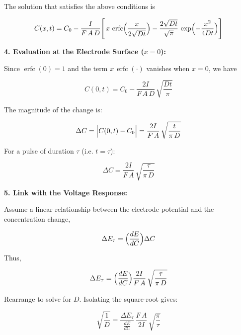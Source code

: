 \documentclass{article}
\begin{document}
The solution that satisfies the above conditions is

\begin{equation}\label{eq:con:4}
C(x,t) = C_0 - \frac{I}{F\,A\,D}\Biggl[\,x\,\operatorname{erfc}\Bigl(\frac{x}{2\sqrt{Dt}}\Bigr) - \frac{2\sqrt{Dt}}{\sqrt{\pi}}\,\exp\Bigl(-\frac{x^2}{4Dt}\Bigr)\Biggr]\,
\end{equation}

\vspace{1ex}
\textbf{4. Evaluation at the Electrode Surface (\( x=0 \)):}

Since \(\operatorname{erfc}(0)=1\) and the term \(x\,\operatorname{erfc}(\cdot)\) vanishes when \( x=0 \), we have

\begin{equation}\label{eq:con:5}
C(0,t) = C_0 - \frac{2I}{F\,A\,D}\,\sqrt{\frac{Dt}{\pi}}\,
\end{equation}

The magnitude of the change is:

\begin{equation}\label{eq:con:6}
\Delta C = \Bigl|C(0,t)-C_0\Bigr| = \frac{2I}{F\,A}\,\sqrt{\frac{t}{\pi\,D}}\,
\end{equation}

For a pulse of duration \(\tau\) (i.e. \(t=\tau\)):

\begin{equation}\label{eq:con:7}
\Delta C = \frac{2I}{F\,A}\,\sqrt{\frac{\tau}{\pi\,D}}\,
\end{equation}

\vspace{1ex}
\textbf{5. Link with the Voltage Response:}

Assume a linear relationship between the electrode potential and the concentration change,

\begin{equation}\label{eq:con:8}
\Delta E_\tau = \Bigl(\frac{dE}{dC}\Bigr)\Delta C\,
\end{equation}

Thus,

\begin{equation}\label{eq:con:9}
\Delta E_\tau = \Bigl(\frac{dE}{dC}\Bigr)\frac{2I}{F\,A}\,\sqrt{\frac{\tau}{\pi\,D}}\,
\end{equation}

Rearrange to solve for \(D\). Isolating the square-root gives:

\begin{equation}\label{eq:con:10}
\sqrt{\frac{1}{D}} = \frac{\Delta E_\tau}{\frac{dE}{dC}}\,\frac{F\,A}{2I}\,\sqrt{\frac{\pi}{\tau}}\,
\end{equation}
\end{document}
